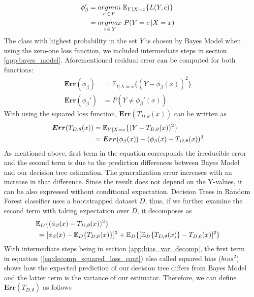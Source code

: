 \begin{align}\label{eq:bayes_model}
\phi_{\beta}' & = \underset{c \,\in\, Y}{argmin} \; \mathbb{E}_{Y|X=x}\{L(Y,c) \} \notag\\
			 & = \underset{c \,\in\, Y}{argmax} \; P(Y = c \,| X = x)
\end{align}
The class with highest probability in the set $Y$ is chosen by Bayes Model when using the zero-one loss function, 
we included intermediate steps in section \ref{app:bayes_model}. 
Aforementioned residual error can be computed for both functions:
\begin{align}
\boldsymbol{Err}(\phi_{\beta}) & = \mathbb{E}_{Y|X=x}\{(Y-\phi_{\beta}(x))^2 \}\\
\boldsymbol{Err}(\phi_{\beta}') & = P(Y \neq \phi_{\beta}'(x) )
\end{align}
With using the squared loss function, $\boldsymbol{Err}(T_{D,\theta}(x))$ can be written as
\begin{align}\label{eq:decomp_squared_loss}
\boldsymbol{Err}(T_{D, \theta}(x)) & = \mathbb{E}_{Y|X=x}\{(Y-T_{D,\theta}(x))^2\} \notag \\
							   	  & = \boldsymbol{Err}(\phi_{\beta}(x)) + (\phi_{\beta}(x)-T_{D,\theta}(x))^2
\end{align}
As mentioned above, first term in the equation corresponds the 
irreducible error and the second term is due to the prediction differences 
between Bayes Model and our decision tree estimation. 
The generalization error increases with an increase in that difference. 
Since the result does not depend on the Y-values, 
it can be also expressed without conditional expectation. 
Decision Trees in Random Forest classifier uses a bootstrapped dataset 
$D$, thus, if we further examine the second term with taking expectation over $D$, it decomposes as
\begin{align}\label{eq:decomp_squared_loss_cont}
	& \mathbb{E}_{D}\{(\phi_{\beta}(x) - T_{D,\theta}(x))^2 \} \notag \\
	& \: = [\phi_{\beta}(x) - \mathbb{E}_{D}\{T_{D,\theta}(x)\}]^2 + 
	\mathbb{E}_{D}\{[\mathbb{E}_{D}\{T_{D,\theta}(x)\} - T_{D,\theta}(x)]^2\}
\end{align}
With intermediate steps being in section \ref{app:bias_var_decomp}, 
the first term in equation (\ref{eq:decomp_squared_loss_cont}) 
also called squared bias ($bias^2$) shows how the expected prediction of our 
decision tree differs from Bayes Model and the latter term is the variance of our estimator. 
Therefore, we can define $\boldsymbol{Err}(T_{D,\theta})$ as follows
